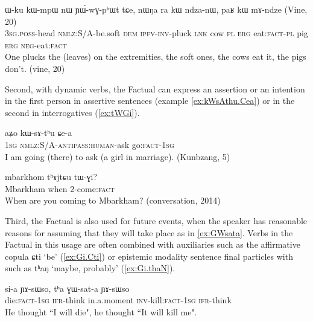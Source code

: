 \documentclass[oldfontcommands,oneside,a4paper,11pt]{article}
\newcommand{\ipa}[1]{{\phon \mbox{#1}}} %
\newcommand{\factual}[1]{\textsc{:fact}}
\begin{document}
\begin{exe}
\ex \label{ex:mAndze}
\gll
   	\ipa{ɯ-ku}  	\ipa{kɯ-mpɯ}  	\ipa{nɯ}  	\ipa{ɲɯ́-wɣ-pʰɯt}  	\ipa{tɕe,}  \ipa{nɯŋa}  	\ipa{ra}  	\ipa{kɯ}  	\ipa{ndza-nɯ,}  	\ipa{paʁ}  	\ipa{kɯ}  	\ipa{mɤ-ndze}  
(Vine, 20) \\
\textsc{3sg.poss}-head \textsc{nmlz}:S/A-be.soft \textsc{dem} \textsc{ipfv-inv}-pluck \textsc{lnk} cow \textsc{pl} \textsc{erg} eat:\textsc{fact-pl} pig \textsc{erg} \textsc{neg}-eat\factual{} \\
\glt  One plucks the (leaves) on the extremities, the soft ones, the cows eat it, the pigs don't. (vine, 20)
\end{exe}

 
Second, with dynamic verbs, the Factual can express an assertion or an intention in the first person in assertive sentences (example \ref{ex:kWsAthu.Cea}) or in the second in interrogatives (\ref{ex:tWGi}).

\begin{exe}
\ex \label{ex:kWsAthu.Cea}
\gll
\ipa{aʑo}  	\ipa{kɯ-sɤ-tʰu}  	\ipa{ɕe-a}  \\
\textsc{1sg} \textsc{nmlz}:S/A-\textsc{antipass:human}-ask go\factual{}-\textsc{1sg} \\
\glt I am going (there) to ask (a girl in marriage). (Kunbzang, 5)
\end{exe}

\begin{exe}
\ex \label{ex:tWGi}
\gll
\ipa{mbarkhom} \ipa{tʰɤjtɕu} \ipa{tɯ-ɣi}?\\
Mbarkham when 2-come\factual{} \\
\glt When are you coming to Mbarkham? (conversation, 2014)
\end{exe}

Third, the Factual is also used for future events, when the speaker has reasonable reasons for assuming that they will take place as in \ref{ex:GWsata}. Verbs in the Factual in this usage are often combined with auxiliaries such as the affirmative copula \ipa{ɕti} `be' (\ref{ex:Gi.Cti}) or epistemic modality sentence final particles with  such as \ipa{tʰaŋ} `maybe, probably' (\ref{ex:Gi.thaN}).

\begin{exe}
\ex \label{ex:GWsata}
\gll
\ipa{si-a}   \ipa{ɲɤ-sɯso,} \ipa{tʰa}  	\ipa{ɣɯ-sat-a}  \ipa{ɲɤ-sɯso} \\
die:\textsc{fact-1sg} \textsc{ifr}-think in.a.moment \textsc{inv}-kill:\textsc{fact-1sg} \textsc{ifr}-think \\
\glt He thought ``I will die", he thought ``It will kill me".
\end{exe}
\end{document}
